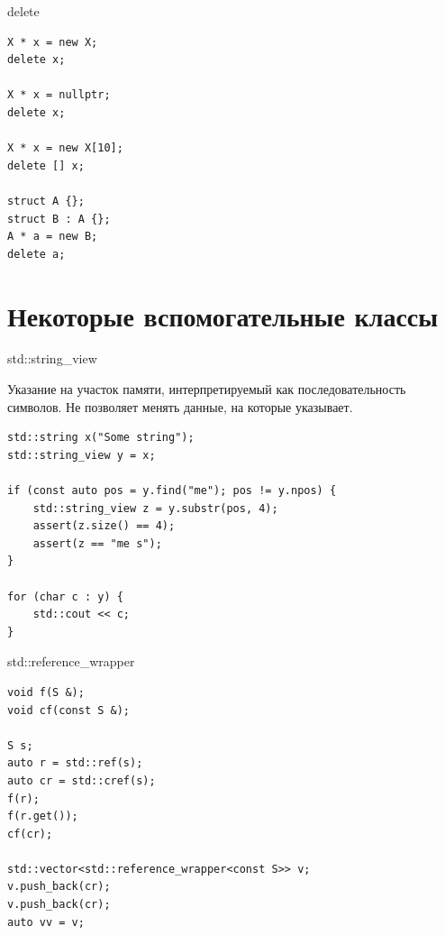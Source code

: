 \documentclass[unknownkeysallowed,xcolor=table]{beamer}
\begin{document}
\begin{frame}[fragile]{delete}

\begin{lstlisting}
X * x = new X;
delete x;

X * x = nullptr;
delete x;

X * x = new X[10];
delete [] x;

struct A {};
struct B : A {};
A * a = new B;
delete a;
\end{lstlisting}

\end{frame}


\section{Некоторые вспомогательные классы}

\begin{frame}[fragile]{std::string\_view}

Указание на участок памяти, интерпретируемый как последовательность символов. Не позволяет менять данные, на которые указывает.

\vspace{1em}

\begin{lstlisting}
std::string x("Some string");
std::string_view y = x;

if (const auto pos = y.find("me"); pos != y.npos) {
    std::string_view z = y.substr(pos, 4);
    assert(z.size() == 4);
    assert(z == "me s");
}

for (char c : y) {
    std::cout << c;
}
\end{lstlisting}

\end{frame}

\begin{frame}[fragile]{std::reference\_wrapper}

\begin{lstlisting}
void f(S &);
void cf(const S &);

S s;
auto r = std::ref(s);
auto cr = std::cref(s);
f(r);
f(r.get());
cf(cr);

std::vector<std::reference_wrapper<const S>> v;
v.push_back(cr);
v.push_back(cr);
auto vv = v;
\end{lstlisting}

\end{frame}

\end{document}
